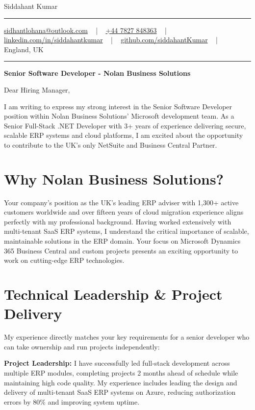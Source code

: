 \documentclass[letterpaper,10pt]{article}
\newcommand{\documentTitle}[2]{
  \begin{center}
    \vspace*{-0.3in}
    {\Huge\color{accentTitle} #1}
    \vspace{8pt}
    {\color{accentLine} \hrule}
    \vspace{2pt}
    \footnotesize{#2}
    \vspace{2pt}
    {\color{accentLine} \hrule}
  \end{center}
}
\begin{document}
\documentTitle{Siddahant Kumar}{
\vspace{0.1cm}
\href{mailto:sidhantlohana@outlook.com}{sidhantlohana@outlook.com} ~ | ~
\href{tel:+447827848363}{+44 7827 848363} ~ | ~
\href{https://www.linkedin.com/in/siddahantkumar/}{linkedin.com/in/siddahantkumar} ~ | ~
\href{https://github.com/siddahantKumar}{github.com/siddahantKumar} ~ | ~
England, UK
}

\begin{center}
\textbf{Senior Software Developer - Nolan Business Solutions}
\end{center}

\vspace{0.2in}

Dear Hiring Manager,

I am writing to express my strong interest in the Senior Software Developer position within Nolan Business Solutions' Microsoft development team. As a Senior Full-Stack .NET Developer with 3+ years of experience delivering secure, scalable ERP systems and cloud platforms, I am excited about the opportunity to contribute to the UK's only NetSuite and Business Central Partner.

\section{Why Nolan Business Solutions?}

Your company's position as the UK's leading ERP adviser with 1,300+ active customers worldwide and over fifteen years of cloud migration experience aligns perfectly with my professional background. Having worked extensively with multi-tenant SaaS ERP systems, I understand the critical importance of scalable, maintainable solutions in the ERP domain. Your focus on Microsoft Dynamics 365 Business Central and custom projects presents an exciting opportunity to work on cutting-edge ERP technologies.

\section{Technical Leadership \& Project Delivery}

My experience directly matches your key requirements for a senior developer who can take ownership and run projects independently:

\textbf{Project Leadership:} I have successfully led full-stack development across multiple ERP modules, completing projects 2 months ahead of schedule while maintaining high code quality. My experience includes leading the design and delivery of multi-tenant SaaS ERP systems on Azure, reducing authorization errors by 80\% and improving system uptime.
\end{document}
